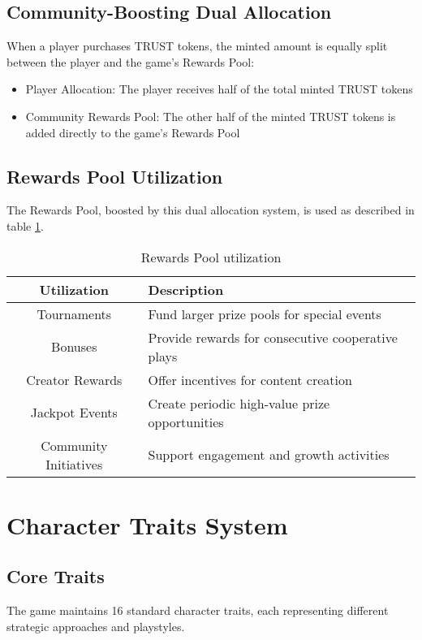 \documentclass[table, twocolumn]{article}
\begin{document}
\subsection{Community-Boosting Dual Allocation}
When a player purchases TRUST tokens, the minted amount is equally split between the
player and the game's Rewards Pool:
\begin{itemize}
    \item Player Allocation: The player receives half of the total minted TRUST tokens
    \item Community Rewards Pool: The other half of the minted TRUST tokens is added directly to the game's Rewards Pool
\end{itemize}

\subsection{Rewards Pool Utilization}
The Rewards Pool, boosted by this dual allocation system, is used as described in
table \ref{tab:rewards-pool-utilization}.

\begin{table}[!htb]
  \centering
  \begin{tabular}{|c|p{5cm}|}
    \hline \rowcolor{gray!20}
    Utilization     & Description                                        \\ \hline
    Tournaments     & Fund larger prize pools for special events         \\ \hline
    Bonuses         & Provide rewards for consecutive cooperative plays  \\ \hline
    Creator Rewards & Offer incentives for content creation              \\ \hline
    Jackpot Events  & Create periodic high-value prize opportunities     \\ \hline
    Community Initiatives & Support engagement and growth activities     \\ \hline
  \end{tabular}
  \caption{Rewards Pool utilization}
  \label{tab:rewards-pool-utilization}
\end{table}

\section{Character Traits System}

\subsection{Core Traits}
The game maintains 16 standard character traits, each representing different strategic
approaches and playstyles.
\end{document}
